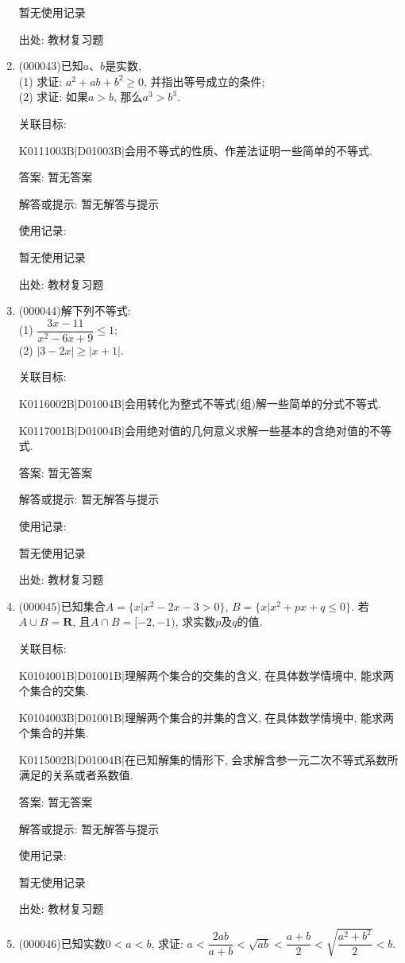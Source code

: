 \documentclass[10pt,a4paper]{article}
\begin{document}
\begin{enumerate}[1.]
暂无使用记录


出处: 教材复习题
\item { (000043)}已知$a$、$b$是实数,\\
(1) 求证: $a^2+ab+b^2\ge 0$, 并指出等号成立的条件;\\
(2) 求证: 如果$a>b$, 那么$a^3>b^3$.


关联目标:

K0111003B|D01003B|会用不等式的性质、作差法证明一些简单的不等式.

答案: 暂无答案

解答或提示: 暂无解答与提示

使用记录:

暂无使用记录


出处: 教材复习题
\item { (000044)}解下列不等式:\\
(1) $\dfrac{3x-11}{x^2-6x+9}\le 1$;\\
(2) $|3-2x| \ge |x+1|$.


关联目标:

K0116002B|D01004B|会用转化为整式不等式(组)解一些简单的分式不等式.

K0117001B|D01004B|会用绝对值的几何意义求解一些基本的含绝对值的不等式.

答案: 暂无答案

解答或提示: 暂无解答与提示

使用记录:

暂无使用记录


出处: 教材复习题
\item { (000045)}已知集合$A=\{x|x^2-2x-3>0\}$, $B=\{x|x^2+px+q\le 0\}$. 若$A\cup B=\mathbf{R}$, 且$A\cap B=[-2,-1)$, 求实数$p$及$q$的值.


关联目标:

K0104001B|D01001B|理解两个集合的交集的含义, 在具体数学情境中, 能求两个集合的交集.

K0104003B|D01001B|理解两个集合的并集的含义, 在具体数学情境中, 能求两个集合的并集.

K0115002B|D01004B|在已知解集的情形下, 会求解含参一元二次不等式系数所满足的关系或者系数值.

答案: 暂无答案

解答或提示: 暂无解答与提示

使用记录:

暂无使用记录


出处: 教材复习题
\item { (000046)}已知实数$0<a<b$, 求证: $a<\dfrac{2ab}{a+b}<\sqrt{ab}<\dfrac{a+b}{2}<\sqrt{\dfrac{a^2+b^2}{2}}<b$.



\end{enumerate}
\end{document}
